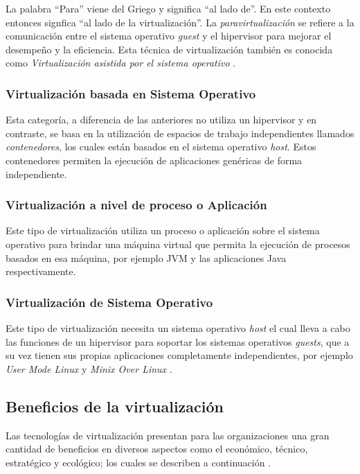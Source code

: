 La palabra ``Para'' viene del Griego y significa ``al lado de''. En este contexto entonces signfica ``al lado de la virtualización''. La \textit{paravirtualización} se refiere a la comunicación entre el sistema operativo \textit{guest} y el hipervisor para mejorar el desempeño y la eficiencia. Esta técnica de virtualización también es conocida como \textit{Virtualización asistida por el sistema operativo} \parencite{VMware2008}.\\

\subsubsection{Virtualización basada en Sistema Operativo}
\vspace{5mm}
Esta categoría, a diferencia de las anteriores no utiliza un hipervisor y en contraste, se basa en la utilización de espacios de trabajo independientes llamados \textit{contenedores}, los cuales están basados en el sistema operativo \textit{host}. Estos contenedores permiten la ejecución de aplicaciones genéricas de forma independiente.\\

\subsubsection{Virtualización a nivel de proceso o Aplicación}
\vspace{5mm}
Este tipo de virtualización utiliza un proceso  o aplicación sobre el sistema operativo para brindar una máquina virtual que permita la ejecución de procesos basados en esa máquina, por ejemplo JVM y las aplicaciones Java respectivamente. \\ 

\subsubsection{Virtualización de Sistema Operativo}
\vspace{5mm}
Este tipo de virtualización necesita un sistema operativo \textit{host} el cual lleva a cabo las funciones de un hipervisor para soportar los sistemas operativos \textit{guests},  que a su vez tienen sus propias aplicaciones completamente independientes, por ejemplo \textit{User Mode Linux} \parencite{Dike2006}  y \textit{Minix Over Linux} \parencite{Pessolani2012}.


\subsection{Beneficios de la virtualización} \label{sec:beneficios}
\vspace{5mm}
Las tecnologías de virtualización presentan para las organizaciones una gran cantidad de beneficios en diversos aspectos como el económico, técnico, estratégico y ecológico; los cuales se describen a continuación \parencite{Shirinbab2019}. \\

